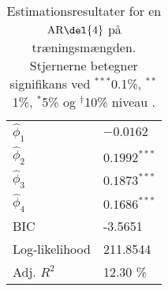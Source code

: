 \begin{table}[h]
\center
\begin{tabular}{ll}
\toprule
$\widehat{\phi}_1$ &$ -0.0162 $ \\
$\widehat{\phi}_2$ & $0.1992^{***}$  \\
$\widehat{\phi}_3$ &$0.1873^{***}$  \\
$\widehat{\phi}_4$ &$0.1686^{***} $ \\ \midrule
BIC & -3.5651 \\
Log-likelihood &  211.8544\\ 
Adj. $R^2$ & 12.30 \% \\ \bottomrule
 \end{tabular}
\caption{Estimationsresultater for en \(\text{AR} \del{4}\) på træningsmængden. Stjernerne betegner signifikans ved $^{***}$0.1\%, $^{**}$1\%, $^{*}$5\% og  $^{\dagger}$10\% niveau .} \label{tab:est_ar}
\end{table}